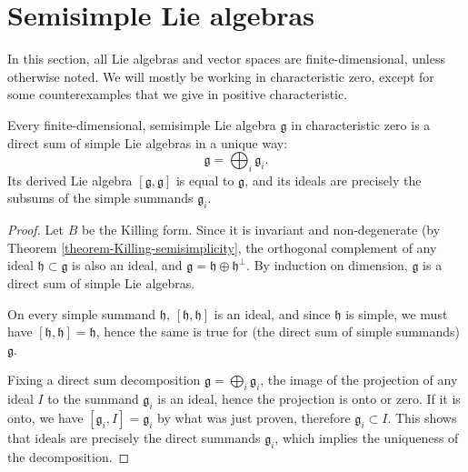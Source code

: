 \section{Semisimple Lie algebras}
\label{section-semisimple}

In this section, all Lie algebras and vector spaces are finite-dimensional, unless otherwise noted. We will mostly be working in characteristic zero, except for some counterexamples that we give in positive characteristic.

\begin{proposition}
\label{proposition-sum-of-simple}
 Every finite-dimensional, semisimple Lie algebra $\mathfrak g$ in characteristic zero is a direct sum of simple Lie algebras in a unique way:
 $$\mathfrak g = \bigoplus_i \mathfrak g_i.$$
 Its derived Lie algebra $[\mathfrak g, \mathfrak g]$ is equal to $\mathfrak g$, and its ideals are precisely the subsums of the simple summands $\mathfrak g_i$.
\end{proposition}

\begin{proof}
 Let $B$ be the Killing form. Since it is invariant and non-degenerate (by Theorem \ref{theorem-Killing-semisimplicity}, the orthogonal complement of any ideal $\mathfrak h\subset \mathfrak g$ is also an ideal, and $\mathfrak g = \mathfrak h \oplus \mathfrak h^\perp$. By induction on dimension, $\mathfrak g$ is a direct sum of simple Lie algebras.
  
 On every simple summand $\mathfrak h$, $[\mathfrak h, \mathfrak h]$ is an ideal, and since $\mathfrak h$ is simple, we must have $[\mathfrak h, \mathfrak h]=\mathfrak h$, hence the same is true for (the direct sum of simple summands) $\mathfrak g$.
 
 Fixing a direct sum decomposition $\mathfrak g = \bigoplus_i \mathfrak g_i$, the image of the projection of any ideal $I$ to the summand $\mathfrak g_i$ is an ideal, hence the projection is onto or zero. If it is onto, we have $[\mathfrak g_i, I] = \mathfrak g_i$ by what was just proven, therefore $\mathfrak g_i\subset I$. This shows that ideals are precisely the direct summands $\mathfrak g_i$, which implies the uniqueness of the decomposition. 
\end{proof}

